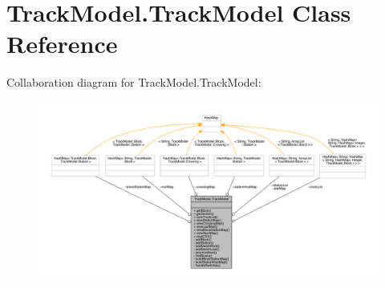 \hypertarget{classTrackModel_1_1TrackModel}{}\section{Track\+Model.\+Track\+Model Class Reference}
\label{classTrackModel_1_1TrackModel}


Collaboration diagram for Track\+Model.\+Track\+Model\+:
\nopagebreak
\begin{figure}[H]
\begin{center}
\leavevmode
\includegraphics[width=350pt]{classTrackModel_1_1TrackModel__coll__graph}
\end{center}
\end{figure}

